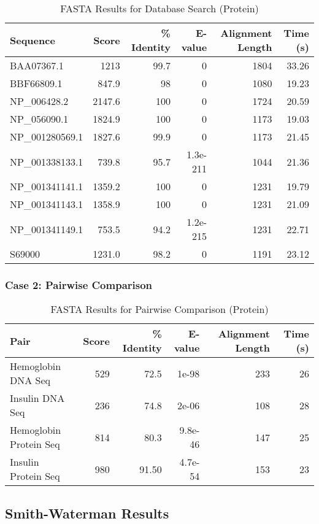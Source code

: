 \documentclass{article}
\begin{document}
\begin{table}[h!]
\centering
\caption{FASTA Results for Database Search (Protein)}
\begin{tabular}{@{}lrrrrr@{}}
\toprule
Sequence & Score & \% Identity & E-value & Alignment Length & Time (s) \\
\midrule
BAA07367.1 & 1213& 99.7& 0& 1804& 33.26\\
BBF66809.1 & 847.9& 98& 0& 1080& 19.23\\
NP\_006428.2 & 2147.6& 100& 0& 1724& 20.59\\
NP\_056090.1 & 1824.9& 100& 0& 1173& 19.03\\
NP\_001280569.1 & 1827.6& 99.9& 0& 1173& 21.45\\
NP\_001338133.1 & 739.8& 95.7& 1.3e-211& 1044& 21.36\\
NP\_001341141.1 & 1359.2& 100& 0& 1231& 19.79\\
NP\_001341143.1 & 1358.9& 100& 0& 1231& 21.09\\
NP\_001341149.1 & 753.5& 94.2& 1.2e-215& 1231& 22.71\\
S69000 & 1231.0& 98.2& 0& 1191& 23.12\\
\bottomrule
\end{tabular}
\end{table}


\subsubsection{Case 2: Pairwise Comparison}

\begin{table}[h]
\centering
\caption{FASTA Results for Pairwise Comparison (Protein)}
\begin{tabular}{@{}lrrrrr@{}}
\toprule
Pair & Score & \% Identity & E-value & Alignment Length & Time (s) \\
\midrule
Hemoglobin DNA Seq & 529 & 72.5 & 1e-98 & 233 & 26 \\
Insulin DNA Seq & 236 & 74.8 & 2e-06 & 108 & 28 \\
Hemoglobin Protein Seq & 814 & 80.3 & 9.8e-46 & 147 & 25 \\
Insulin Protein Seq & 980 & 91.50 & 4.7e-54 & 153 & 23 \\
\bottomrule
\end{tabular}
\end{table}

\subsection{Smith-Waterman Results}
\end{document}
